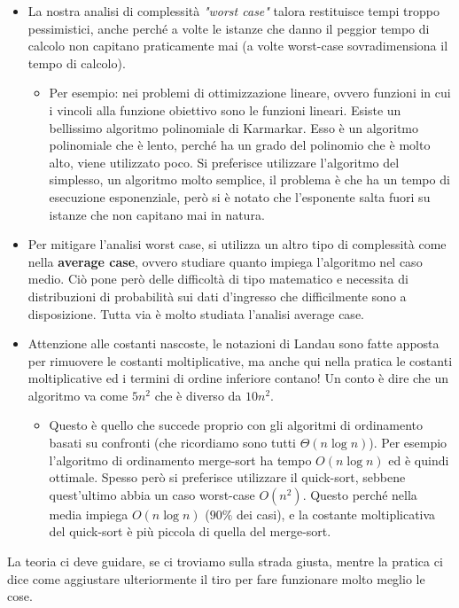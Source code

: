 \documentclass{article}
\begin{document}
\begin{itemize}
    \item La nostra analisi di complessità \textit{"worst case"} talora restituisce tempi troppo
          pessimistici, anche perché a volte le istanze che danno il peggior tempo di calcolo non capitano
          praticamente mai (a volte worst-case sovradimensiona il tempo di calcolo).
          \begin{itemize}
              \item Per esempio: nei problemi di ottimizzazione lineare, ovvero funzioni in cui i vincoli
                    alla funzione obiettivo sono le funzioni lineari. Esiste un bellissimo algoritmo polinomiale
                    di Karmarkar. Esso è un algoritmo polinomiale che è lento, perché ha un grado del polinomio
                    che è molto alto, viene utilizzato poco. Si preferisce utilizzare l'algoritmo del simplesso,
                    un algoritmo molto semplice, il problema è che ha un tempo di esecuzione esponenziale, però
                    si è notato che l'esponente salta fuori su istanze che non capitano mai in natura.
          \end{itemize}

    \item Per mitigare l'analisi worst case, si utilizza un altro tipo di complessità come nella
          \textbf{average case}, ovvero studiare quanto impiega l'algoritmo nel caso medio. Ciò pone
          però delle difficoltà di tipo matematico e necessita di distribuzioni di probabilità sui dati
          d'ingresso che difficilmente sono a disposizione. Tutta via è molto studiata l'analisi
          average case.

    \item Attenzione alle costanti nascoste, le notazioni di Landau sono fatte apposta per
          rimuovere le costanti moltiplicative, ma anche qui nella pratica le costanti moltiplicative
          ed i termini di ordine inferiore contano! Un conto è dire che un algoritmo va come $5n^2$
          che è diverso da $10n^2$.
          \begin{itemize}
              \item Questo è quello che succede proprio con gli algoritmi di ordinamento
                    basati su confronti (che ricordiamo sono tutti $\Theta (n\log n)$). Per
                    esempio l'algoritmo di ordinamento merge-sort ha tempo $O(n\log n)$ ed
                    è quindi ottimale. Spesso però si preferisce utilizzare il quick-sort, sebbene
                    quest'ultimo abbia un caso worst-case $O(n^2)$. Questo perché nella media
                    impiega $O(n\log n)$ ($90\%$ dei casi), e la costante moltiplicativa del quick-sort
                    è più piccola di quella del merge-sort.
          \end{itemize}

\end{itemize}
La teoria ci deve guidare, se ci troviamo sulla strada giusta, mentre la pratica ci dice
come aggiustare ulteriormente il tiro per fare funzionare molto meglio le cose.
\end{document}
